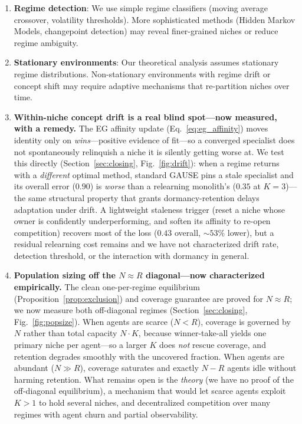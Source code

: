 \documentclass{article}
\begin{document}
\begin{enumerate}
    \item \textbf{Regime detection}: We use simple regime classifiers (moving average crossover, volatility thresholds). More sophisticated methods (Hidden Markov Models, changepoint detection) may reveal finer-grained niches or reduce regime ambiguity.

    \item \textbf{Stationary environments}: Our theoretical analysis assumes stationary regime distributions. Non-stationary environments with regime drift or concept shift may require adaptive mechanisms that re-partition niches over time.

    \item \textbf{Within-niche concept drift is a real blind spot---now measured,
    with a remedy.} The EG affinity update (Eq.~\eqref{eq:eg_affinity}) moves identity
    only on \emph{wins}---positive evidence of fit---so a converged specialist does not
    spontaneously relinquish a niche it is silently getting worse at. We test this
    directly (Section~\ref{sec:closing}, Fig.~\ref{fig:drift}): when a regime returns
    with a \emph{different} optimal method, standard GAUSE pins a stale specialist and
    its overall error ($0.90$) is \emph{worse} than a relearning monolith's ($0.35$ at
    $K{=}3$)---the same structural property that grants dormancy-retention delays
    adaptation under drift. A lightweight staleness trigger (reset a niche whose owner
    is confidently underperforming, and soften its affinity to re-open competition)
    recovers most of the loss ($0.43$ overall, $\sim53\%$ lower), but a residual
    relearning cost remains and we have not characterized drift rate, detection
    threshold, or the interaction with dormancy in general.

    \item \textbf{Population sizing off the $N \approx R$ diagonal---now characterized
    empirically.} The clean one-per-regime equilibrium
    (Proposition~\ref{prop:exclusion}) and coverage guarantee are proved for
    $N \approx R$; we now measure both off-diagonal regimes
    (Section~\ref{sec:closing}, Fig.~\ref{fig:popsize}). When agents are scarce
    ($N<R$), coverage is governed by $N$ rather than total capacity $N\!\cdot\!K$,
    because winner-take-all yields one primary niche per agent---so a larger $K$ does
    \emph{not} rescue coverage, and retention degrades smoothly with the uncovered
    fraction. When agents are abundant ($N\gg R$), coverage saturates and exactly
    $N-R$ agents idle without harming retention. What remains open is the
    \emph{theory} (we have no proof of the off-diagonal equilibrium), a mechanism that
    would let scarce agents exploit $K>1$ to hold several niches, and decentralized
    competition over many regimes with agent churn and partial observability.


\end{enumerate}
\end{document}
